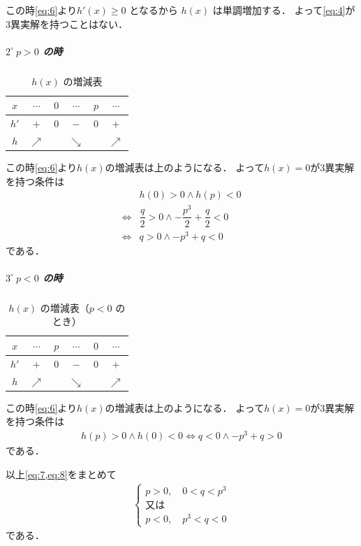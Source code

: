\documentclass[../../main.tex]{subfiles}
\begin{document}
この時\cref{eq:6}より$h'(x) \ge 0$ となるから $h(x)$ は単調増加する．
よって\cref{eq:4}が3異実解を持つことはない．

\subparagraph{$2^\circ \ p > 0$ の時}

\begin{table}[htb]
  \centering
  \caption{$h(x)$ の増減表}
  \begin{tabular}{|c|c|c|c|c|c|}
    \hline
    $x$ & $\cdots$ & $0$ & $\cdots$ & $p$ & $\cdots$ \\
    \hline
    $h'$ & $+$ & $0$ & $-$ & $0$ & $+$ \\
    \hline
    $h$ & $\nearrow$ & & $\searrow$ & & $\nearrow$ \\
    \hline
  \end{tabular}
\end{table}

この時\cref{eq:6}より$h(x)$の増減表は上のようになる．
よって$h(x)=0$が3異実解を持つ条件は
\begin{align}
  & h(0) > 0 \land h(p) < 0 \\
  \iff & \dfrac{q}{2} > 0 \land - \dfrac{p^3}{2} + \dfrac{q}{2} < 0 \\
  \iff & q > 0 \land -p^3 + q < 0 \label{eq:7}
\end{align}
である．

\subparagraph{$3^\circ \ p < 0$ の時}

\begin{table}[htb]
  \centering
  \caption{$h(x)$ の増減表（$p<0$ のとき）}
  \label{tab:variation_p_neg}
  \begin{tabular}{|c|c|c|c|c|c|}
    \hline
    $x$ & $\cdots$ & $p$ & $\cdots$ & $0$ & $\cdots$ \\
    \hline
    $h'$ & $+$ & $0$ & $-$ & $0$ & $+$ \\
    \hline
    $h$ & $\nearrow$ & & $\searrow$ & & $\nearrow$ \\
    \hline
  \end{tabular}
\end{table}

この時\cref{eq:6}より$h(x)$の増減表は上のようになる．
よって$h(x)=0$が3異実解を持つ条件は
\begin{align}
  h(p) > 0 \land h(0) < 0 \iff q < 0 \land -p^3 + q > 0 \label{eq:8}
\end{align}
である．
\casesend

以上\cref{eq:7,eq:8}をまとめて
\begin{align}
  \begin{cases}
    p > 0, \quad 0 < q < p^3 \\
    \text{又は} \\
    p < 0, \quad p^3 < q < 0
  \end{cases}
\end{align}
である．
\end{document}
